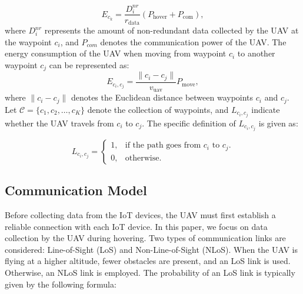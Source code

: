 \documentclass[sigconf]{acmart}
\begin{document}
\begin{equation}
     E_{c_k}=\frac{D_{i}^{nr}}{r_\text{data}}(P_\text{hover}+P_\text{com}),
\end{equation}
where $D_{i}^{nr}$ represents the amount of non-redundant data collected by the UAV at the waypoint $c_i$, and $P_{com}$ denotes the communication power of the UAV.
The energy consumption of the UAV when moving from waypoint $c_i$ to another waypoint $c_j$ can be represented as:
\begin{equation}
     E_{{c_{i},c_{j}}}=\frac{\|c_{i}-c_{j}\|}{v_{{\mathrm{uav}}}}P_{{\mathrm{move}}},
\end{equation}
where $\|c_i-c_j\|$ denotes the Euclidean distance between waypoints $c_i$ and $c_j$. Let $\mathcal{C}=\{c_1,c_2,\ldots,c_K\}$ denote the collection of waypoints, and $L_{c_i,c_j}$ indicate whether the UAV travels from $c_i$ to $c_j$. The specific definition of $L_{c_i,c_j}$ is given as:


\begin{equation}
     L_{{c_{i},c_{j}}}=
\begin{cases}
1, & \text{if the path goes from } c_{i} \text{ to } c_{j}. \\
0, & \text{otherwise.}
\end{cases}
\end{equation}

\subsection{Communication Model}
Before collecting data from the IoT devices, the UAV must first establish a reliable connection with each IoT device. In this paper, we focus on data collection by the UAV during hovering. Two types of communication links are considered: Line-of-Sight (LoS) and Non-Line-of-Sight (NLoS). When the UAV is flying at a higher altitude, fewer obstacles are present, and an LoS link is used. Otherwise, an NLoS link is employed. The probability of an LoS link is typically given by the following formula:
\end{document}
